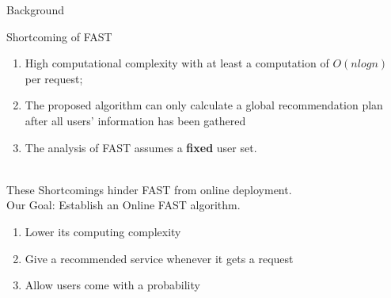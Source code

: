 \begin{frame}{Background}

 \begin{block}{Shortcoming of FAST}
  \begin{enumerate}
     \item High computational complexity with at least a computation of $O(n log n)$ per request;
     \item The proposed algorithm can only calculate a global recommendation plan after all users’ information has been gathered
     \item The analysis of FAST assumes a \textbf{fixed} user set.
     
 \end{enumerate}
 \end{block}


~\\

These Shortcomings hinder FAST from online deployment.
~\\

Our Goal: Establish an Online FAST algorithm.
     \begin{enumerate}
     \item Lower its computing complexity
     \item Give a recommended service whenever it gets a request
     \item Allow users come with a probability
     
 \end{enumerate}
\end{frame}

